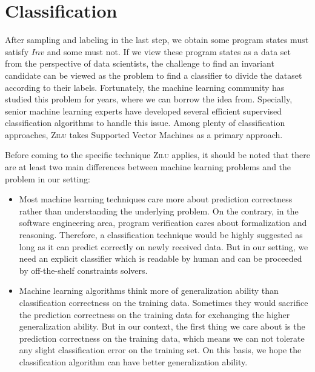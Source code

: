 
\section{Classification} %
\label{sec:classification}

After sampling and labeling in the last step, we obtain some program states must satisfy $Inv$ and some must not. 
If we view these program states as a data set from the perspective of data scientists, 
the challenge to find an invariant candidate can be viewed as the problem to find a classifier to divide the dataset according to their labels.
Fortunately, the machine learning community has studied this problem for years, where we can borrow the idea from.
Specially, senior machine learning experts have developed several efficient supervised classification algorithms to handle this issue.
Among plenty of classification approaches, \textsc{Zilu} takes Supported Vector Machines as a primary approach.

Before coming to the specific technique \textsc{Zilu} applies,
it should be noted that there are at least two main differences between machine learning problems and the problem in our setting:
\begin{itemize}
\item Most machine learning techniques care more about prediction correctness rather than understanding the underlying problem.
On the contrary, in the software engineering area, program verification cares about formalization and reasoning.
Therefore, a classification technique would be highly suggested as long as it can predict correctly on newly received data.
But in our setting, we need an explicit classifier which is readable by human and can be proceeded by off-the-shelf constraints solvers.

\item Machine learning algorithms think more of generalization ability than classification correctness on the training data.
Sometimes they would sacrifice the prediction correctness on the training data for exchanging the higher generalization ability.
But in our context, the first thing we care about is the prediction  correctness on the training data,
which means we can not tolerate any slight classification error on the training set.
On this basis, we hope the classification algorithm can have better generalization ability.
\end{itemize} 


